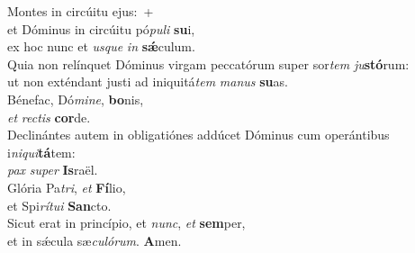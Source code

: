 \evenverse Montes in circúitu ejus:~+\\\evenverse  et Dóminus in circúitu pó\textit{pu}\textit{li} \textbf{su}i,~\*\\
\evenverse ex hoc nunc et \textit{us}\textit{que} \textit{in} \textbf{sǽ}culum.\\
\oddverse Quia non relínquet Dóminus virgam peccatórum super sor\textit{tem} \textit{ju}\textbf{stó}rum:~\*\\
\oddverse ut non exténdant justi ad iniquitá\textit{tem} \textit{ma}\textit{nus} \textbf{su}as.\\
\evenverse Bénefac, Dó\textit{mi}\textit{ne}, \textbf{bo}nis,~\*\\
\evenverse \textit{et} \textit{re}\textit{ctis} \textbf{cor}de.\\
\oddverse Declinántes autem in obligatiónes addúcet Dóminus cum operántibus i\textit{ni}\textit{qui}\textbf{tá}tem:~\*\\
\oddverse \textit{pax} \textit{su}\textit{per} \textbf{Is}raël.\\
\evenverse Glória Pa\textit{tri}, \textit{et} \textbf{Fí}lio,~\*\\
\evenverse et Spi\textit{rí}\textit{tu}\textit{i} \textbf{San}cto.\\
\oddverse Sicut erat in princípio, et \textit{nunc}, \textit{et} \textbf{sem}per,~\*\\
\oddverse et in sǽcula sæ\textit{cu}\textit{ló}\textit{rum}. \textbf{A}men.\\
